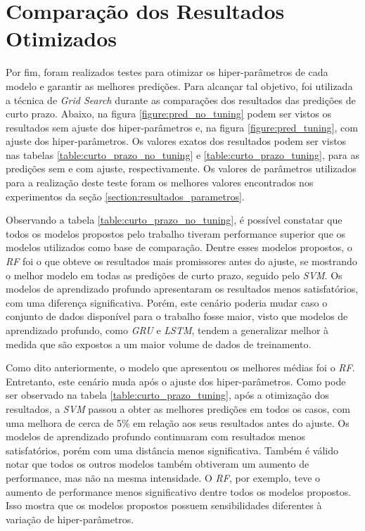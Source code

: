 \section{Comparação dos Resultados Otimizados}

 Por fim, foram realizados testes para otimizar os hiper-parâmetros de cada modelo e garantir as melhores predições. Para alcançar tal objetivo, foi utilizada a técnica de \textit{Grid Search} durante as comparações dos resultados das predições de curto prazo. Abaixo, na figura \ref{figure:pred_no_tuning} podem ser vistos os resultados sem ajuste dos hiper-parâmetros e, na figura \ref{figure:pred_tuning}, com ajuste dos hiper-parâmetros. Os valores exatos dos resultados podem ser vistos nas tabelas  \ref{table:curto_prazo_no_tuning} e \ref{table:curto_prazo_tuning}, para as predições sem e com ajuste, respectivamente. Os valores de parâmetros utilizados para a realização deste teste foram os melhores valores encontrados nos experimentos da seção \ref{section:resultados_parametros}.
 
 Observando a tabela \ref{table:curto_prazo_no_tuning}, é possível constatar que todos os modelos propostos pelo trabalho tiveram performance superior que os modelos utilizados como base de comparação. Dentre esses modelos propostos, o \textit{\acrshort{RF}} foi o que obteve os resultados mais promissores antes do ajuste, se mostrando o melhor modelo em todas as predições de curto prazo, seguido pelo \textit{\acrshort{SVM}}. Os modelos de aprendizado profundo apresentaram os resultados menos satisfatórios, com uma diferença significativa. Porém, este cenário poderia mudar caso o conjunto de dados disponível para o trabalho fosse maior, visto que modelos de aprendizado profundo, como \textit{\acrshort{GRU}} e \textit{\acrshort{LSTM}}, tendem a generalizar melhor à medida que são expostos a um maior volume de dados de treinamento. 

Como dito anteriormente, o modelo que apresentou os melhores médias foi o \textit{\acrshort{RF}}. Entretanto, este cenário muda após o ajuste dos hiper-parâmetros. Como pode ser observado na tabela \ref{table:curto_prazo_tuning}, após a otimização dos resultados, a \textit{\acrshort{SVM}} passou a obter as melhores predições em todos os casos, com uma melhora de cerca de 5\% em relação aos seus resultados antes do ajuste. Os modelos de aprendizado profundo continuaram com resultados menos satisfatórios, porém com uma distância menos significativa. Também é válido notar que todos os outros modelos também obtiveram um aumento de performance, mas não na mesma intensidade. O \textit{\acrshort{RF}}, por exemplo, teve o aumento de performance menos significativo dentre todos os modelos propostos. Isso mostra que os modelos propostos possuem sensibilidades diferentes à variação de hiper-parâmetros.
 
